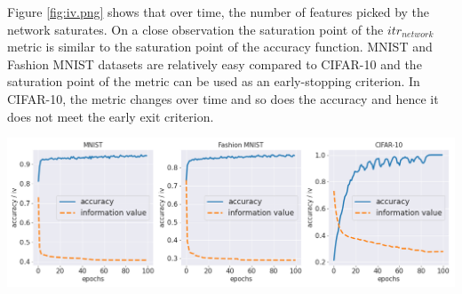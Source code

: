 \documentclass{article}
\begin{document}
\begin{minipage}{.4\textwidth}
Figure \ref{fig:iv.png} shows that over time, the number of features picked by the network saturates. On a close observation the saturation point of the $itr_{network}$ metric is similar to the saturation point of the accuracy function. MNIST and Fashion MNIST datasets are relatively easy compared to CIFAR-10 and the saturation point of the metric can be used as an early-stopping criterion. In CIFAR-10, the metric changes over time and so does the accuracy and hence it does not meet the early exit criterion.
\end{minipage}
\begin{minipage}{.5\textwidth}
    \centering
    \includegraphics[scale=0.25]{paper/iv.png}
    \label{fig:iv.png}
\end{minipage}
\end{document}
